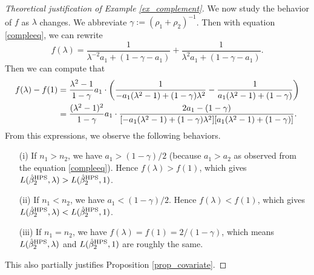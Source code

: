 \begin{example}
\begin{proof}[Theoretical justification of Example \ref{ex_complement}]

We now study the behavior of $f$ as $\lambda$ changes.
We abbreviate $\gamma:=(\rho_1 + \rho_2)^{-1}$. Then with equation \eqref{compleeq}, we can rewrite
$$f(\lambda)= \frac{1}{\lambda^{-2}{a_1} + (1-\gamma - a_1)} + \frac{1}{\lambda^2a_1 + (1-\gamma - a_1)}.$$
Then we can compute that
\begin{align*}
f(\lambda) - f(1)&= \frac{ \lambda^2-1}{1-\gamma} a_1\cdot \left({  \frac{1}{ -a_1(\lambda^2-1)+(1-\gamma)\lambda^2 } - \frac{1}{a_1(\lambda^2-1) + (1-\gamma)}}\right) \\
&= \frac{(\lambda^2-1)^2}{1-\gamma}  a_1\cdot  \frac{2a_1 - (1-\gamma) }{[-a_1(\lambda^2-1)+(1-\gamma)\lambda^2 ][a_1(\lambda^2-1) + (1-\gamma)]} .
\end{align*}
From this expressions, we observe the following behaviors.
\begin{itemize}
\item[(i)] If $n_1>n_2$, we have $a_1>(1-\gamma)/2$ (because $a_1>a_2$ as observed from the equation \eqref{compleeq}). Hence $f(\lambda)>f(1)$, which gives $L(\hat \beta_{2}^{\textup{HPS}},\lambda)>L(\hat \beta_{2}^{\textup{HPS}},1)$.

\item[(ii)] If $n_1< n_2$, we have $a_1< (1-\gamma)/2$. Hence $f(\lambda)< f(1)$, which gives $L(\hat \beta_{2}^{\textup{HPS}},\lambda)<L(\hat \beta_{2}^{\textup{HPS}},1)$.

\item[(iii)] If $n_1=n_2$, we have $f(\lambda)=f(1)=2/(1-\gamma)$, which means $L(\hat \beta_{2}^{\textup{HPS}},\lambda)$ and $L(\hat \beta_{2}^{\textup{HPS}},1)$ are roughly the same. %
\end{itemize}
This also partially justifies Proposition \ref{prop_covariate}. %
\end{proof}


\end{example}
